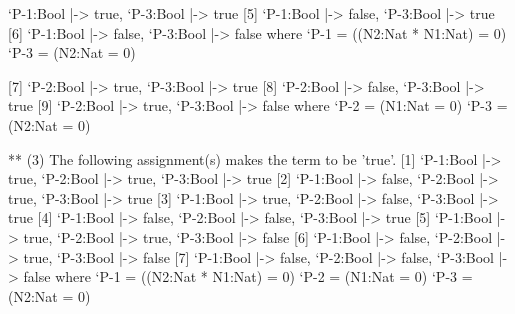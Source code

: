 \documentclass[a4paper,oneside,10pt,here]{memoir}
\begin{document}
\begin{itemize}
\begin{simplev}
[4] { `P-1:Bool |-> true, `P-3:Bool |-> true }
[5] { `P-1:Bool |-> false, `P-3:Bool |-> true }
[6] { `P-1:Bool |-> false, `P-3:Bool |-> false }
where
  `P-1 = ((N2:Nat * N1:Nat) = 0)
  `P-3 = (N2:Nat = 0)
  
[7] { `P-2:Bool |-> true, `P-3:Bool |-> true }
[8] { `P-2:Bool |-> false, `P-3:Bool |-> true }
[9] { `P-2:Bool |-> true, `P-3:Bool |-> false }
where
  `P-2 = (N1:Nat = 0)
  `P-3 = (N2:Nat = 0)
  
** (3) The following assignment(s) makes the term to be 'true'.
[1] { `P-1:Bool |-> true, `P-2:Bool |-> true, `P-3:Bool |-> true }
[2] { `P-1:Bool |-> false, `P-2:Bool |-> true, `P-3:Bool |-> true }
[3] { `P-1:Bool |-> true, `P-2:Bool |-> false, `P-3:Bool |-> true }
[4] { `P-1:Bool |-> false, `P-2:Bool |-> false, `P-3:Bool |-> true }
[5] { `P-1:Bool |-> true, `P-2:Bool |-> true, `P-3:Bool |-> false }
[6] { `P-1:Bool |-> false, `P-2:Bool |-> true, `P-3:Bool |-> false }
[7] { `P-1:Bool |-> false, `P-2:Bool |-> false, `P-3:Bool |-> false }
where
  `P-1 = ((N2:Nat * N1:Nat) = 0)
  `P-2 = (N1:Nat = 0)
  `P-3 = (N2:Nat = 0)
\end{simplev}
\end{itemize}
\end{document}
